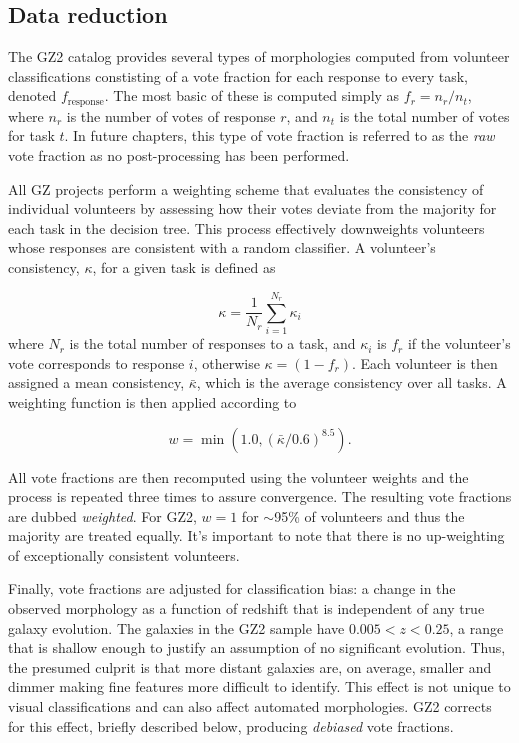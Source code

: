 \subsection{Data reduction}
The GZ2 catalog provides several types of morphologies computed from volunteer classifications constisting of a vote fraction for each response to every task, denoted $f_{\mathrm{response}}$. The most basic of these is computed simply as $f_r = n_r/n_t$, where $n_r$ is the number of votes of response $r$, and $n_t$ is the total number of votes for task $t$. In future chapters, this type of vote fraction is referred to as the \textit{raw} vote fraction as no post-processing has been performed. 

All GZ projects perform a weighting scheme that evaluates the consistency of individual volunteers by assessing how their votes deviate from the majority for each task in the decision tree. This process effectively downweights volunteers whose responses are consistent with a random classifier. A volunteer's consistency, $\kappa$, for a given task is defined as 

\begin{equation}
\kappa = \frac{1}{N_r}\sum_{i=1}^{N_r}{\kappa_i}
\end{equation}
where $N_r$ is the total number of responses to a task, and $\kappa_i$ is $f_r$ if the volunteer's vote corresponds to response $i$, otherwise $\kappa=(1-f_r)$. Each volunteer is then assigned a mean consistency, $\bar\kappa$, which is the average consistency over all tasks. A weighting function is then applied according to  

\begin{equation}
w = \min({1.0, (\bar\kappa/0.6)^{8.5}}).
\end{equation}

All vote fractions are then recomputed using the volunteer weights and the process is repeated three times to assure convergence. The resulting vote fractions are dubbed \textit{weighted}. For GZ2, $w=1$ for $\sim$95\% of volunteers and thus the majority are treated equally. It's important to note that there is no up-weighting of exceptionally consistent volunteers.


Finally, vote fractions are adjusted for classification bias: a change in the observed morphology as a function of redshift that is independent of any true galaxy evolution. The galaxies in the GZ2 sample have $0.005<z<0.25$, a range that is shallow enough to justify an assumption of no significant evolution.  Thus, the presumed culprit is that more distant galaxies are, on average, smaller and dimmer making fine features more difficult to identify. This effect is not unique to visual classifications and can also affect automated morphologies. GZ2 corrects for this effect, briefly described below, producing \textit{debiased} vote fractions.

